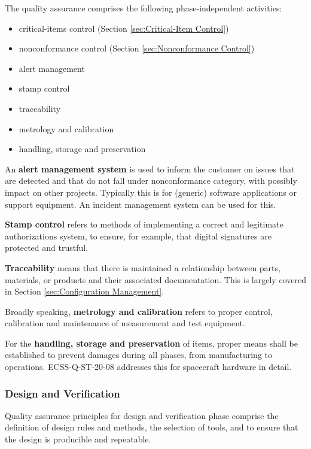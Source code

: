 The quality assurance comprises the following phase-independent activities:

\begin{itemize}
\item critical-items control (Section \ref{sec:Critical-Item Control})
\item nonconformance control (Section \ref{sec:Nonconformance Control})
\item alert management 
\item stamp control
\item traceability 
\item metrology and calibration 
\item handling, storage and preservation

\end{itemize}

An \textbf{alert management system} is used to inform the customer on issues that are detected and that do not fall under nonconformance category, with possibly impact on other projects. Typically this is for (generic) software applications or support equipment. An incident management system can be used for this.

\textbf{Stamp control} refers to methods of implementing a correct and legitimate authorizations system, to ensure, for example, that digital signatures are protected and trustful.

\textbf{Traceability} means that there is maintained a relationship between parts, materials, or products and their associated documentation. This is largely covered in Section \ref{sec:Configuration Management}.

Broadly speaking, \textbf{metrology and calibration} refers to proper control, calibration and maintenance of measurement and test equipment. 

For the \textbf{handling, storage and preservation} of items, proper means shall be established to prevent damages during all phases, from manufacturing to operations. ECSS-Q-ST-20-08 \cite{ECSS-Q-ST-20-08} addresses this for spacecraft hardware in detail.

\subsubsection{Design and Verification}

Quality assurance principles for design and verification phase comprise the definition of design rules and methods, the selection of tools, and to ensure that the design is producible and repeatable.

